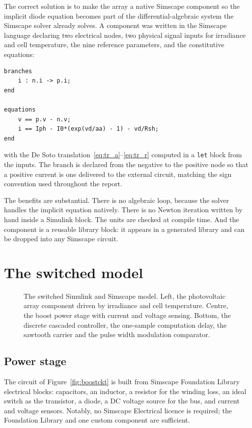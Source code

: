 The correct solution is to make the array a native Simscape component so the
implicit diode equation becomes part of the differential-algebraic system the
Simscape solver already solves. A component was written in the Simscape language
declaring two electrical nodes, two physical signal inputs for irradiance and
cell temperature, the nine reference parameters, and the constitutive equations:

\begin{verbatim}
branches
    i : n.i -> p.i;
end

equations
    v == p.v - n.v;
    i == Iph - I0*(exp(vd/aa) - 1) - vd/Rsh;
end
\end{verbatim}

with the De Soto translation~\eqref{eq:tr_a}--\eqref{eq:tr_r} computed in a
\texttt{let} block from the inputs. The branch is declared from the negative to
the positive node so that a positive current is one delivered to the external
circuit, matching the sign convention used throughout the report.

The benefits are substantial. There is no algebraic loop, because the solver
handles the implicit equation natively. There is no Newton iteration written by
hand inside a Simulink block. The units are checked at compile time. And the
component is a reusable library block: it appears in a generated library and can
be dropped into any Simscape circuit.

\section{The switched model}

\begin{figure}[htbp]
\centering
{}
\caption[Simulink switched model]{The switched Simulink and Simscape model. Left, the photovoltaic array component driven by irradiance and cell temperature. Centre, the boost power stage with current and voltage sensing. Bottom, the discrete cascaded controller, the one-sample computation delay, the sawtooth carrier and the pulse width modulation comparator.}
\label{fig:slxmodel}
\end{figure}

\subsection{Power stage}

The circuit of Figure~\ref{fig:boostckt} is built from Simscape Foundation
Library electrical blocks: capacitors, an inductor, a resistor for the winding
loss, an ideal switch as the transistor, a diode, a DC voltage source for the
bus, and current and voltage sensors. Notably, no Simscape Electrical licence is
required; the Foundation Library and one custom component are sufficient.

